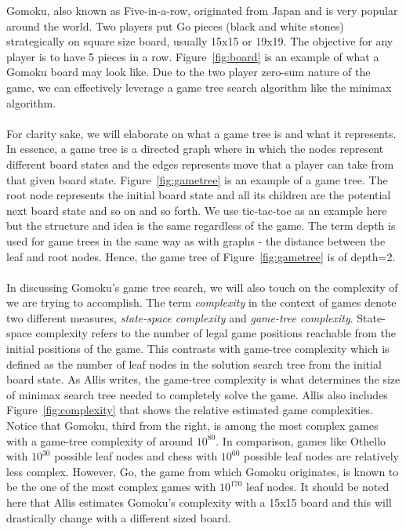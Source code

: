 Gomoku, also known as Five-in-a-row, originated from Japan and is very popular around the world. Two players put Go pieces (black and white stones) strategically on square size board, usually 15x15 or 19x19. The objective for any player is to have 5 pieces in a row. Figure~\ref{fig:board} is an example of what a Gomoku board may look like. Due to the two player zero-sum nature of the game, we can effectively leverage a game tree search algorithm like the minimax algorithm.\\
\\
For clarity sake, we will elaborate on what a game tree is and what it represents. In essence, a game tree is a directed graph where in which the nodes represent different board states and the edges represents move that a player can take from that given board state. Figure~\ref{fig:gametree} is an example of a game tree. The root node represents the initial board state and all its children are the potential next board state and so on and so forth. We use tic-tac-toe as an example here but the structure and idea is the same regardless of the game. The term depth is used for game trees in the same way as with graphs -  the distance between the leaf and root nodes. Hence, the game tree of Figure~\ref{fig:gametree} is of depth=2.\\
\\
In discussing Gomoku's game tree search, we will also touch on the complexity of we are trying to accomplish. The term \textit{complexity} in the context of games denote two different measures, \textit{state-space complexity} and \textit{game-tree complexity}. State-space complexity refers to the number of legal game positions reachable from the initial positions of the game. This contrasts with game-tree complexity which is defined as the number of leaf nodes in the solution search tree from the initial board state. \cite{allis_1994} As Allis writes, the game-tree complexity is what determines the size of minimax search tree needed to completely solve the game. Allis also includes Figure~\ref{fig:complexity} that shows the relative estimated game complexities. Notice that Gomoku, third from the right, is among the most complex games with a game-tree complexity of around $10^{80}$. In comparison, games like Othello with $10^{30}$ possible leaf nodes and chess with $10^{60}$ possible leaf nodes are relatively less complex. However, Go, the game from which Gomoku originates, is known to be the one of the most complex games with $10^{170}$ leaf nodes. It should be noted here that Allis estimates Gomoku's complexity with a 15x15 board and this will drastically change with a different sized board.\\

